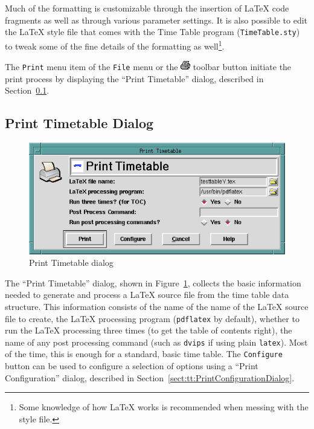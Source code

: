 Much of the formatting is customizable through the insertion of \LaTeX{}
code fragments as well as through various parameter settings.  It is
also possible to edit the \LaTeX{} style file that comes with the Time
Table program (\texttt{TimeTable.sty}) to tweak some of the fine details
of the formatting as well\footnote{Some knowledge of how \LaTeX{} works
is recommended when messing with the style file.}.

The \texttt{Print} menu item of the \texttt{File} menu or the
\includegraphics{TTprintTool.png} toolbar button initiate the print
process by displaying the ``Print Timetable'' dialog, described in
Section~\ref{sect:tt:PrintTimetableDialog}.


\subsection{Print Timetable Dialog}
\label{sect:tt:PrintTimetableDialog}

\begin{figure}[hbpt]
\begin{centering}
\includegraphics[width=5in]{TTPrintTimetableDialog.png}
\caption{Print Timetable dialog}  
\label{fig:tt:PrintTimetableDialog}
\end{centering}
\end{figure}
The ``Print Timetable'' dialog, shown in
Figure~\ref{fig:tt:PrintTimetableDialog}, collects the basic
information needed to generate and process a \LaTeX{} source file from
the time table data structure.  This information consists of the name of
the name of the \LaTeX{} source file to create, the \LaTeX{} processing
program (\texttt{pdflatex} by default), whether to run the \LaTeX{}
processing three times (to get the table of contents right), the name of
any post processing command (such as \texttt{dvips} if using plain
\texttt{latex}).  Most of the time, this is enough for a standard, basic
time table.  The \texttt{Configure} button can be used to configure a
selection of options using a ``Print Configuration'' dialog, described
in Section~\ref{sect:tt:PrintConfigurationDialog}.

